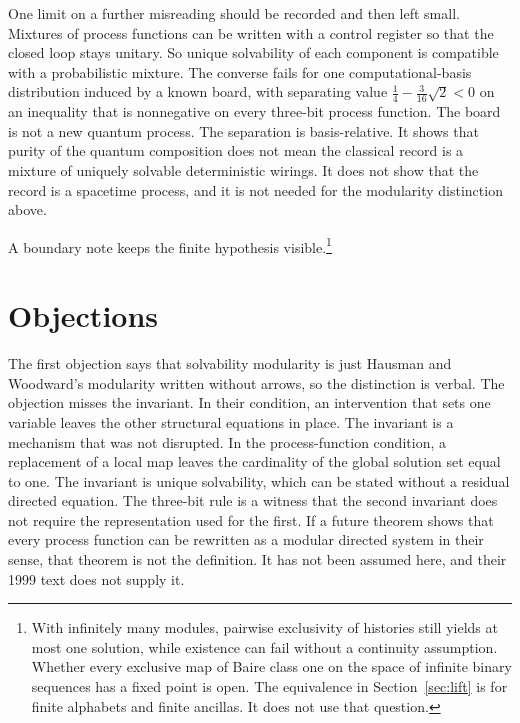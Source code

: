 \documentclass[11pt]{article}
\begin{document}
One limit on a further misreading should be recorded and then left small. Mixtures of process functions can be written with a control register so that the closed loop stays unitary. So unique solvability of each component is compatible with a probabilistic mixture. The converse fails for one computational-basis distribution induced by a known board, with separating value \(\tfrac14-\tfrac{3}{16}\sqrt{2}<0\) on an inequality that is nonnegative on every three-bit process function. The board is not a new quantum process. The separation is basis-relative. It shows that purity of the quantum composition does not mean the classical record is a mixture of uniquely solvable deterministic wirings. It does not show that the record is a spacetime process, and it is not needed for the modularity distinction above.

A boundary note keeps the finite hypothesis visible.\footnote{With infinitely many modules, pairwise exclusivity of histories still yields at most one solution, while existence can fail without a continuity assumption. Whether every exclusive map of Baire class one on the space of infinite binary sequences has a fixed point is open. The equivalence in Section~\ref{sec:lift} is for finite alphabets and finite ancillas. It does not use that question.}

\section{Objections}
\label{sec:obj}

The first objection says that solvability modularity is just Hausman and Woodward's modularity written without arrows, so the distinction is verbal. The objection misses the invariant. In their condition, an intervention that sets one variable leaves the other structural equations in place. The invariant is a mechanism that was not disrupted. In the process-function condition, a replacement of a local map leaves the cardinality of the global solution set equal to one. The invariant is unique solvability, which can be stated without a residual directed equation. The three-bit rule is a witness that the second invariant does not require the representation used for the first. If a future theorem shows that every process function can be rewritten as a modular directed system in their sense, that theorem is not the definition. It has not been assumed here, and their 1999 text does not supply it.
\end{document}
